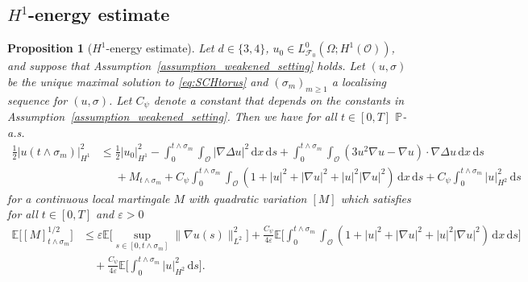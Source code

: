 \documentclass[reqno]{amsart}
\newtheorem{proposition}[Satz]{Proposition}
\newcommand{\E}{\mathbb{E}}
\newcommand{\F}{\mathscr{F}}
\newcommand{\sO}{\mathscr{O}}
\newcommand{\1}{\mathbf{1}}
\newcommand{\grad}{\nabla}
\newcommand{\ds}{\,\mathrm{d}s}
\newcommand{\dx}{\,\mathrm{d}x}
\newcommand{\inttm}{\int_0^{t\wedge\sigma_m}}
\newcommand{\intsO}{\int_{\sO}}
\begin{document}
\subsection{\texorpdfstring{$H^1$}{\textit{H1}}-energy estimate}
\label{subsec:H1energyEst}
\begin{proposition}[$H^1$-energy estimate]
\label{prop:H1energyEstimate}
    Let $d\in \{3,4\}$, $u_0\in L^0_{\F_0}(\Omega;H^1(\sO))$, and suppose that Assumption~\ref{assumption_weakened_setting} holds. Let $(u,\sigma)$ be the unique maximal solution to \eqref{eq:SCHtorus} and $(\sigma_m)_{m\ge 1}$ a localising sequence for $(u,\sigma)$. Let $C_\psi$ denote a constant that depends on the constants in Assumption~\ref{assumption_weakened_setting}. Then we have for all $t\in[0,T]$  $\mathbb{P}$-a.s.
    \begin{equation}\label{eq:H1energyEst}
    \begin{aligned}
    \frac{1}{2}|u(t \land \sigma_m)|^2_{H^1}
    &\le \frac{1}{2}|u_0|^2_{H^1}
    - \inttm \intsO |\grad \Delta u|^2 \dx \ds
    + \inttm \intsO  (3u^2 \grad u- \grad u) \cdot \grad \Delta u \dx \ds  \\
    &\phantom{\le } + M_{t\land\sigma_m}
    +  C_\psi\inttm  \intsO  (1+|u|^2+|\grad u|^2 + |u|^2|\grad u|^2) \dx \ds  + C_\psi \inttm   |u|_{H^2}^2 \ds
    \end{aligned}
    \end{equation}
    for a continuous local martingale  $M$ with quadratic variation $[M]$ which satisfies for all $t\in[0,T]$  and $\varepsilon>0$
    \begin{equation}
    \label{eq:M2quadrVarEstimated3}
    \begin{aligned}
    \E\big[ [M]^{1/2}_{t\wedge \sigma_m}\big] & \leq \varepsilon \E\bigg[\sup_{s\in[0,t\wedge \sigma_m]}  \|\grad u(s) \|^2_{L^2} \bigg]  +  \frac{C_\psi}{4\varepsilon}\E\Big[ \inttm  \intsO(1+|u|^2+|\grad u|^2 + |u|^2|\grad u|^2)\dx\ds\Big] \\
    &  \quad + \frac{C_\psi}{4\varepsilon}\E\Big[ \inttm  |u|_{H^2}^2 \ds\Big].
    \end{aligned}
    \end{equation}

\end{proposition}
\end{document}
